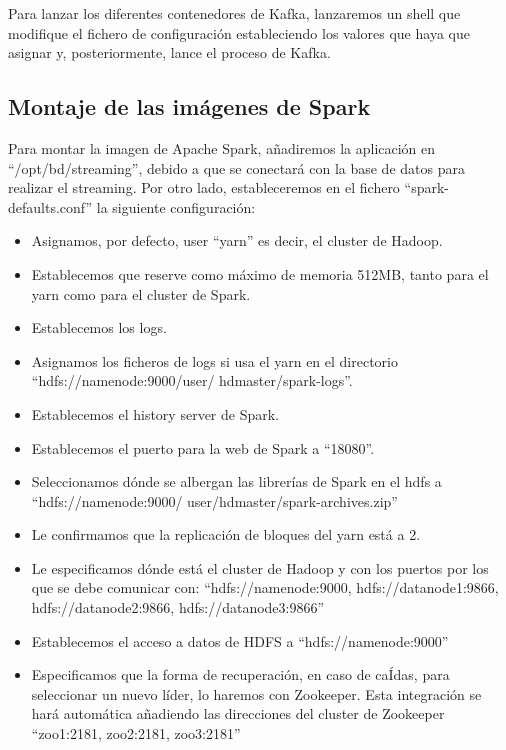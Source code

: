 Para lanzar los diferentes contenedores de Kafka, lanzaremos un shell que modifique el fichero de configuración estableciendo los valores que haya que asignar y, posteriormente, lance el proceso de Kafka.


\subsection {Montaje de las imágenes de Spark\label{montSpark}}

Para montar la imagen de Apache Spark, añadiremos la aplicación en “/opt/bd/streaming”, debido a que se conectará con la base de datos para realizar el streaming. Por otro lado, estableceremos en el fichero “spark-defaults.conf” la siguiente configuración:
\begin{itemize}
        \item Asignamos, por defecto, user “yarn” es decir, el cluster de Hadoop.
        \item Establecemos que reserve como máximo de memoria 512MB, tanto para el yarn como para el cluster de Spark.
        \item Establecemos los logs.
        \item Asignamos los ficheros de logs si usa el yarn en el directorio “hdfs://namenode:9000/user/ hdmaster/spark-logs”.
        \item Establecemos el history server de Spark.
        \item Establecemos el puerto para la web de Spark a “18080”.
        \item Seleccionamos dónde se albergan las librerías de Spark en el hdfs a “hdfs://namenode:9000/ user/hdmaster/spark-archives.zip”
        \item Le confirmamos que la replicación de bloques del yarn está a 2.
        \item Le especificamos dónde está el cluster de Hadoop y con los puertos por los que se debe comunicar con: “hdfs://namenode:9000, hdfs://datanode1:9866, hdfs://datanode2:9866, hdfs://datanode3:9866”
        \item Establecemos el acceso a datos de HDFS a “hdfs://namenode:9000”
        \item Especificamos que la forma de recuperación, en caso de caÍdas, para seleccionar un nuevo líder, lo haremos con Zookeeper. Esta integración se hará automática añadiendo las direcciones del cluster de Zookeeper “zoo1:2181, zoo2:2181, zoo3:2181”
\end{itemize}

